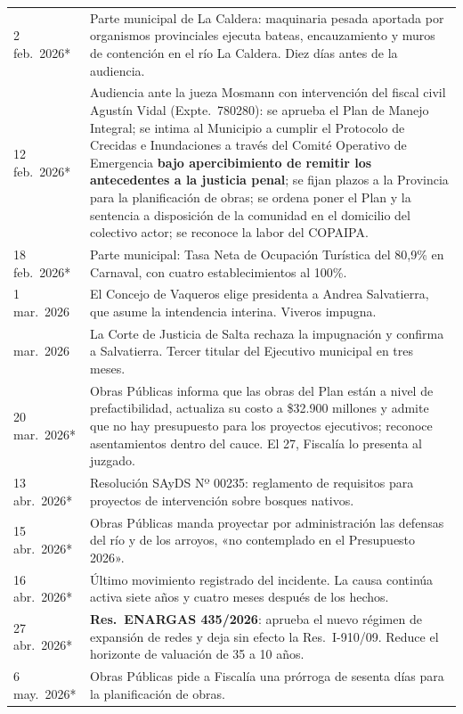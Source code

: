 \begin{longtable}{@{}p{2.7cm}p{10.3cm}@{}}
2 feb.\ 2026* & Parte municipal de La Caldera: maquinaria pesada aportada por organismos provinciales ejecuta bateas, encauzamiento y muros de contención en el río La Caldera. Diez días antes de la audiencia. \\
12 feb.\ 2026* & Audiencia ante la jueza Mosmann con intervención del fiscal civil Agustín Vidal (Expte.\ 780280): se aprueba el Plan de Manejo Integral; se intima al Municipio a cumplir el Protocolo de Crecidas e Inundaciones a través del Comité Operativo de Emergencia \textbf{bajo apercibimiento de remitir los antecedentes a la justicia penal}; se fijan plazos a la Provincia para la planificación de obras; se ordena poner el Plan y la sentencia a disposición de la comunidad en el domicilio del colectivo actor; se reconoce la labor del COPAIPA. \\
18 feb.\ 2026* & Parte municipal: Tasa Neta de Ocupación Turística del 80,9\% en Carnaval, con cuatro establecimientos al 100\%. \\
1 mar.\ 2026 & El Concejo de Vaqueros elige presidenta a Andrea Salvatierra, que asume la intendencia interina. Viveros impugna. \\
mar.\ 2026 & La Corte de Justicia de Salta rechaza la impugnación y confirma a Salvatierra. Tercer titular del Ejecutivo municipal en tres meses. \\
20 mar.\ 2026* & Obras Públicas informa que las obras del Plan están a nivel de prefactibilidad, actualiza su costo a \$32.900 millones y admite que no hay presupuesto para los proyectos ejecutivos; reconoce asentamientos dentro del cauce. El 27, Fiscalía lo presenta al juzgado. \\
13 abr.\ 2026* & Resolución SAyDS Nº 00235: reglamento de requisitos para proyectos de intervención sobre bosques nativos. \\
15 abr.\ 2026* & Obras Públicas manda proyectar por administración las defensas del río y de los arroyos, «no contemplado en el Presupuesto 2026». \\
16 abr.\ 2026* & Último movimiento registrado del incidente. La causa continúa activa siete años y cuatro meses después de los hechos. \\
27 abr.\ 2026* & \textbf{Res.\ ENARGAS 435/2026}: aprueba el nuevo régimen de expansión de redes y deja sin efecto la Res.\ I-910/09. Reduce el horizonte de valuación de 35 a 10 años. \\
6 may.\ 2026* & Obras Públicas pide a Fiscalía una prórroga de sesenta días para la planificación de obras. \\

\end{longtable}
